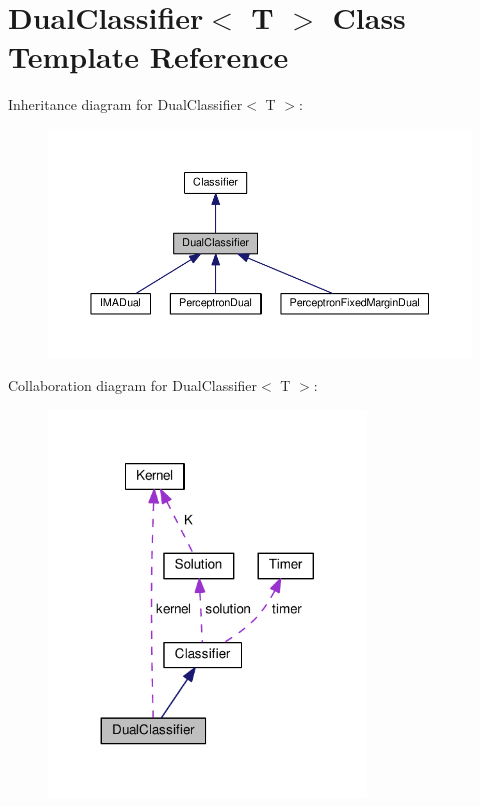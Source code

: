 \hypertarget{class_dual_classifier}{}\section{Dual\+Classifier$<$ T $>$ Class Template Reference}
\label{class_dual_classifier}


Inheritance diagram for Dual\+Classifier$<$ T $>$\+:\nopagebreak
\begin{figure}[H]
\begin{center}
\leavevmode
\includegraphics[width=350pt]{class_dual_classifier__inherit__graph}
\end{center}
\end{figure}


Collaboration diagram for Dual\+Classifier$<$ T $>$\+:\nopagebreak
\begin{figure}[H]
\begin{center}
\leavevmode
\includegraphics[width=239pt]{class_dual_classifier__coll__graph}
\end{center}
\end{figure}
